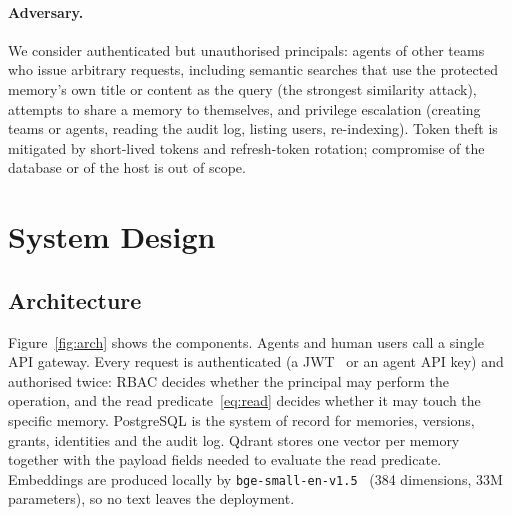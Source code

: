 \documentclass[11pt,a4paper]{article}
\begin{document}
\paragraph{Adversary.} We consider authenticated but unauthorised principals: agents of other teams who
issue arbitrary requests, including semantic searches that use the protected memory's own title or
content as the query (the strongest similarity attack), attempts to share a memory to themselves, and
privilege escalation (creating teams or agents, reading the audit log, listing users, re-indexing). Token
theft is mitigated by short-lived tokens and refresh-token rotation; compromise of the database or of the
host is out of scope.

\section{System Design}
\label{sec:design}

\subsection{Architecture}

Figure~\ref{fig:arch} shows the components. Agents and human users call a single API gateway. Every
request is authenticated (a JWT~\cite{rfc7519} or an agent API key) and authorised twice: RBAC decides
whether the principal may perform the operation, and the read predicate~\eqref{eq:read} decides whether it
may touch the specific memory. PostgreSQL is the system of record for memories, versions, grants,
identities and the audit log. Qdrant stores one vector per memory together with the payload fields needed to
evaluate the read predicate. Embeddings are produced locally by \texttt{bge-small-en-v1.5}~\cite{xiao2023cpack}
(384 dimensions, 33M parameters), so no text leaves the deployment.
\end{document}
